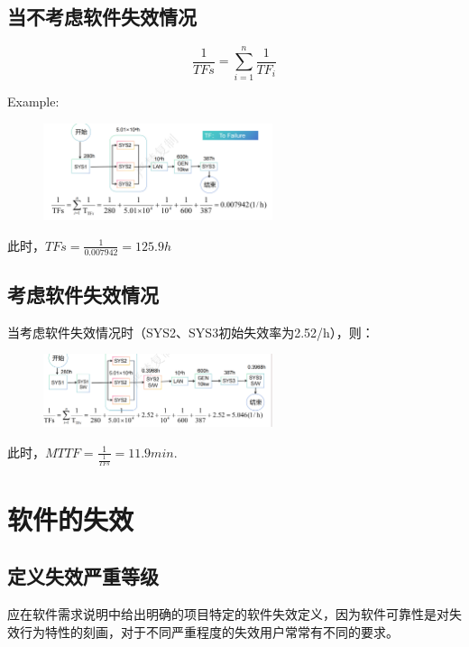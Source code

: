 \subsection{当不考虑软件失效情况}

\[
  \frac{1}{TFs} = \sum_{i=1}^{n} \frac{1}{TF_{i}}
\]

Example:

\begin{figure} [H]
  \centering
  \includegraphics[width=0.6\textwidth]{img2/mttf.png}
  \label{fig:mttf}
\end{figure}

此时，\( TFs = \frac{1}{0.007942} = 125.9h \)

\subsection{考虑软件失效情况}

当考虑软件失效情况时（SYS2、SYS3初始失效率为2.52/h），则：

\begin{figure} [H]
  \centering
  \includegraphics[width=0.6\textwidth]{img2/mttf2.png}
  \label{fig:mttf}
\end{figure}

此时，\( MTTF = \frac{1}{\frac{1}{TFs}} = 11.9 min \).

\section{软件的失效}

\subsection{定义失效严重等级}

应在软件需求说明中给出明确的项目特定的软件失效定义，因为软件可靠性是对失效行为特性的刻画，对于不同严重程度的失效用户常常有不同的要求。

